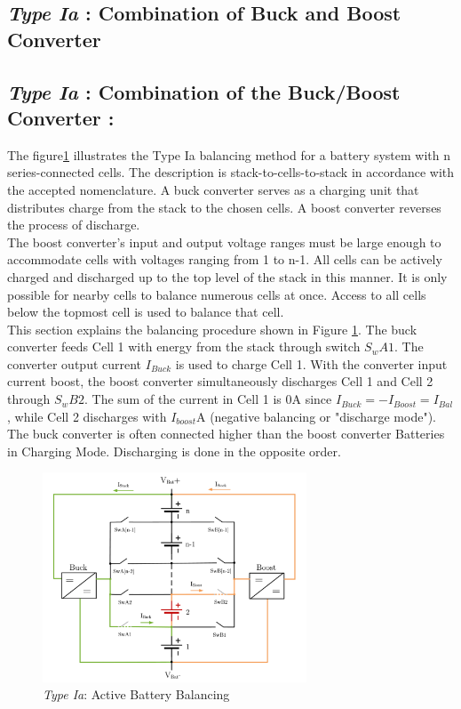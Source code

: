\subsection{\textit{Type Ia} : Combination of Buck and Boost Converter}

\subsection{\textit{Type Ia} : Combination of the Buck/Boost Converter :}
The figure\ref{fig:Type 1a Active Battery Balancing} illustrates the Type Ia balancing method for a battery system with n series-connected cells. The description is stack-to-cells-to-stack in accordance with the accepted nomenclature. A buck converter serves as a charging unit that distributes charge from the stack to the chosen cells. A boost converter reverses the process of discharge.
\\
The boost converter's input and output voltage ranges must be large enough to accommodate cells with voltages ranging from 1 to n-1. All cells can be actively charged and discharged up to the top level of the stack in this manner. It is only possible for nearby cells to balance numerous cells at once. Access to all cells below the topmost cell is used to balance that cell.
\\
This section explains the balancing procedure shown in Figure \ref{fig:Type 1a Active Battery Balancing}. The buck converter feeds Cell 1 with energy from the stack through switch \textit{$S_wA1$}. The converter output current $I_{Buck}$ is used to charge Cell 1. With the converter input current boost, the boost converter simultaneously discharges Cell 1 and Cell 2 through \textit{$S_wB2$}. The sum of the current in Cell 1 is 0A since $I_{Buck} = -I_{Boost} = I_{Bal}$, while Cell 2 discharges with $I_{boost}$A (negative balancing or "discharge mode"). The buck converter is often connected higher than the boost converter Batteries in Charging Mode. Discharging is done in the opposite order.
\\

\begin{figure}[h]
	\centering
	\includegraphics[width=0.7\textwidth]{Chap04/Figures/Type1a_ABMS.PNG}
	\caption{\textit{Type Ia}: Active Battery Balancing} 
	\label{fig:Type 1a Active Battery Balancing}
\end{figure}

